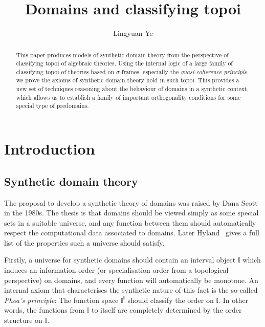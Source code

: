 \documentclass[12pt]{amsart}
\title{Domains and classifying topoi}
\author{Lingyuan Ye}
\theoremstyle{definition}
\newcommand{\mbb}[1]{\mathbb{#1}}
\newcommand{\I}{\mbb I}
\begin{document}
%

%
%

%
%
\begin{abstract}
  This paper produces models of synthetic domain theory from the perspective of classifying topoi of algebraic theories. Using the internal logic of a large family of classifying topoi of theories based on $\sigma$-frames, especially the \emph{quasi-coherence principle}, we prove the axioms of synthetic domain theory hold in such topoi. This provides a new set of techniques reasoning about the behaviour of domains in a synthetic context, which allows us to establish a family of important orthogonality conditions for some special type of predomains.
\end{abstract}
%
\maketitle              %
%

\section{Introduction}\label{sec:intro}

\subsection{Synthetic domain theory}\label{subsec:sdt}

The proposal to develop a synthetic theory of domains was raised by Dana Scott in the 1980s. The thesis is that domains should be viewed simply as some special sets in a suitable universe, and any function between them should automatically respect the computational data associated to domains. Later Hyland~\cite{hyland2006first} gives a full list of the properties such a universe should satisfy.

Firstly, a universe for synthetic domains should contain an interval object $\I$ which induces an information order (or specialisation order from a topological perspective) on domains, and every function will automatically be monotone. An internal axiom that characterises the synthetic nature of this fact is the so-called \emph{Phoa's principle}: The function space $\I^\I$ should classify the order on $\I$. In other words, the functions from $\I$ to itself are completely determined by the order structure on $\I$. 
\end{document}
